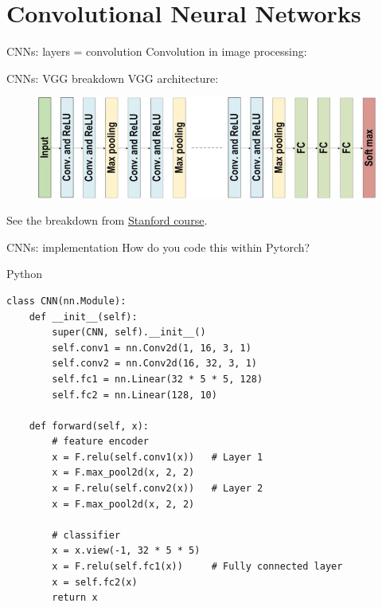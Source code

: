 \documentclass[8pt, table, aspectratio=169]{beamer}
\begin{document}
\section{Convolutional Neural Networks}

\begin{frame}{CNNs: layers = convolution}
	Convolution in image processing:
    \begin{figure}
		\centering
	\end{figure}
\end{frame}




\begin{frame}{CNNs: VGG breakdown}
	VGG architecture:
	\begin{figure}
		\centering
		\includegraphics[width=0.8\linewidth]{figures/VGG.png}
	\end{figure}
	See the breakdown from {\color{blue}\href{http://cs231n.github.io/convolutional-networks/\#conv}{Stanford course}}.
	
\end{frame}

\begin{frame}[fragile]{CNNs: implementation}
	How do you code this within Pytorch?
	\begin{exampleblock}{Python}
		\begin{overprint}
			\begin{verbatim}
class CNN(nn.Module):
	def __init__(self):
		super(CNN, self).__init__()
		self.conv1 = nn.Conv2d(1, 16, 3, 1)
		self.conv2 = nn.Conv2d(16, 32, 3, 1)
		self.fc1 = nn.Linear(32 * 5 * 5, 128)
		self.fc2 = nn.Linear(128, 10)

	def forward(self, x):
		# feature encoder
		x = F.relu(self.conv1(x))   # Layer 1
		x = F.max_pool2d(x, 2, 2)
		x = F.relu(self.conv2(x))   # Layer 2
		x = F.max_pool2d(x, 2, 2)
		
		# classifier
		x = x.view(-1, 32 * 5 * 5)
		x = F.relu(self.fc1(x))     # Fully connected layer
		x = self.fc2(x)
		return x
		\end{verbatim}
		\end{overprint}
	\end{exampleblock}
\end{frame}
\end{document}
